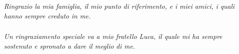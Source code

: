 \vspace{3cm}





{\large {\itshape Ringrazio la mia famiglia, il mio punto di riferimento, e i miei amici, i quali hanno sempre creduto in me.}}
\vspace{3cm}



\subsubsection{} %
\label{ssub:}

{\large {\itshape Un ringraziamento speciale va a mio fratello Luca, il quale mi ha sempre sostenuto e spronato a dare il meglio di me.}}